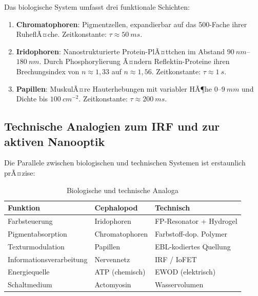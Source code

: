 ﻿\documentclass[a4paper,12pt]{scrreprt}
\theoremstyle{definition}
\begin{document}
Das biologische System umfasst drei funktionale Schichten:
\begin{enumerate}[leftmargin=*, label=\textbf{\arabic*.}]
  \item \textbf{Chromatophoren}: Pigmentzellen, expandierbar auf das 500-Fache
    ihrer RuheflÃ¤che. Zeitkonstante: $\tau \approx \SI{50}{ms}$.
  \item \textbf{Iridophoren}: Nanostrukturierte Protein-PlÃ¤ttchen im Abstand
    $\SI{90}{nm}$--$\SI{180}{nm}$. Durch Phosphorylierung Ã¤ndern Reflektin-Proteine
    ihren Brechungsindex von $n \approx 1{,}33$ auf $n \approx 1{,}56$.
    Zeitkonstante: $\tau \approx \SI{1}{s}$.
  \item \textbf{Papillen}: MuskulÃ¤re Hauterhebungen mit variabler HÃ¶he
    $0$--$\SI{9}{mm}$ und Dichte bis $\SI{100}{cm^{-2}}$.
    Zeitkonstante: $\tau \approx \SI{200}{ms}$.
\end{enumerate}

\subsection{Technische Analogien zum IRF und zur aktiven Nanooptik}

Die Parallele zwischen biologischen und technischen Systemen ist erstaunlich prÃ¤zise:

\begin{table}[h!]
  \scriptsize
  \centering
  \caption{Biologische und technische Analoga}
  \label{tab:analogien}
  \begin{tabular}{p{3.5cm}p{4cm}p{4cm}}
    \toprule
    \textbf{Funktion} & \textbf{Cephalopod} & \textbf{Technisch} \\
    \midrule
    Farbsteuerung     & Iridophoren          & FP-Resonator + Hydrogel \\
    Pigmentabsorption & Chromatophoren       & Farbstoff-dop. Polymer \\
    Texturmodulation  & Papillen             & EBL-kodiertes Quellung \\
    Informationsverarbeitung & Nervennetz    & IRF / IoFET \\
    Energiequelle     & ATP (chemisch)       & EWOD (elektrisch) \\
    Schaltmedium      & Actomyosin           & Wasservolumen \\
    \bottomrule
  \end{tabular}
\end{table}

\end{document}
